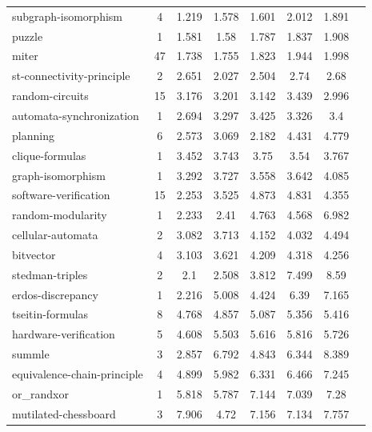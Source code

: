 \documentclass[12pt,a4paper,twoside]{scrartcl}
\numberwithin{equation}{section}
\begin{document}
\begin{longtable}{ lccccccc }
  subgraph-isomorphism	          &	4	&	1.219	&	1.578	&	1.601	&	2.012	&	1.891       \\
  puzzle	                        &	1	&	1.581	&	1.58	&	1.787	&	1.837	&	1.908       \\
  miter	                          &	47	&	1.738	&	1.755	&	1.823	&	1.944	&	1.998       \\
  st-connectivity-principle	      &	2	&	2.651	&	2.027	&	2.504	&	2.74	&	2.68        \\
  random-circuits	                &	15	&	3.176	&	3.201	&	3.142	&	3.439	&	2.996       \\
  automata-synchronization	      &	1	&	2.694	&	3.297	&	3.425	&	3.326	&	3.4	        \\
  planning	                      &	6	&	2.573	&	3.069	&	2.182	&	4.431	&	4.779       \\
  clique-formulas	                &	1	&	3.452	&	3.743	&	3.75	&	3.54	&	3.767       \\
  graph-isomorphism	              &	1	&	3.292	&	3.727	&	3.558	&	3.642	&	4.085       \\
  software-verification	          &	15	&	2.253	&	3.525	&	4.873	&	4.831	&	4.355       \\
  random-modularity	              &	1	&	2.233	&	2.41	&	4.763	&	4.568	&	6.982       \\
  cellular-automata	              &	2	&	3.082	&	3.713	&	4.152	&	4.032	&	4.494       \\
  bitvector	                      &	4	&	3.103	&	3.621	&	4.209	&	4.318	&	4.256       \\
  stedman-triples	                &	2	&	2.1	&	2.508	&	3.812	&	7.499	&	8.59	&       \\
  erdos-discrepancy	              &	1	&	2.216	&	5.008	&	4.424	&	6.39	&	7.165       \\
  tseitin-formulas	              &	8	&	4.768	&	4.857	&	5.087	&	5.356	&	5.416       \\
  hardware-verification	          &	5	&	4.608	&	5.503	&	5.616	&	5.816	&	5.726       \\
  summle	                        &	3	&	2.857	&	6.792	&	4.843	&	6.344	&	8.389       \\
  equivalence-chain-principle     &	4	&	4.899	&	5.982	&	6.331	&	6.466	&	7.245       \\
  or\_randxor	                    &	1	&	5.818	&	5.787	&	7.144	&	7.039	&	7.28        \\
  mutilated-chessboard	          &	3	&	7.906	&	4.72	&	7.156	&	7.134	&	7.757       \\

\end{longtable}
\end{document}
